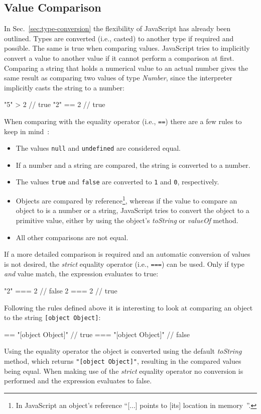 \subsection{Value Comparison}
\label{sec:value-comparison}

In Sec.~\ref{sec:type-conversion} the flexibility of JavaScript has already been outlined. Types are converted (i.e., casted) to another type if required and possible.  The same is true when comparing values. JavaScript tries to implicitly convert a value to another value if it cannot perform a comparison at first. Comparing a string that holds a numerical value to an actual number gives the same result as comparing two values of type \emph{Number}, since the interpreter implicitly casts the string to a number:
\begin{JsCode}[numbers=none]
"5" > 2 // true
"2" == 2 // true
\end{JsCode}
When comparing with the equality operator (i.e., \texttt{==}) there are a few rules to keep in mind~\cite[p.~72]{JavaScriptTheDefinitiveGuide:Flanagan:2011}:
\begin{itemize}
  \item The values \texttt{null} and \texttt{undefined} are considered equal.
  \item If a number and a string are compared, the string is converted to a number.
  \item The values \texttt{true} and \texttt{false} are converted to \texttt{1} and \texttt{0}, respectively.
  \item Objects are compared by reference\footnote{In JavaScript an object's reference ``[...] points to [its] location in memory~\cite{ByValueByReference:Aggarwal:2017}''.}, whereas if the value to compare an object to is a number or a string, JavaScript tries to convert the object to a primitive value, either by using the object's \emph{toString} or \emph{valueOf} method.
  \item All other comparisons are not equal.
\end{itemize}
If a more detailed comparison is required and an automatic conversion of values is not desired, the \emph{strict} equality operator (i.e., \texttt{===}) can be used. Only if type \emph{and} value match, the expression evaluates to true:
\begin{JsCode}[numbers=none]
"2" === 2 // false
2 === 2   // true
\end{JsCode}
Following the rules defined above it is interesting to look at comparing an object to the string \texttt{[object Object]}:
\begin{JsCode}[numbers=none]
{} == "[object Object]"  // true
{} === "[object Object]" // false
\end{JsCode}
Using the equality operator the object is converted using the default \emph{toString} method, which returns \texttt{"[object Object]"}, resulting in the compared values being equal. When making use of the \emph{strict} equality operator no conversion is performed and the expression evaluates to false.

